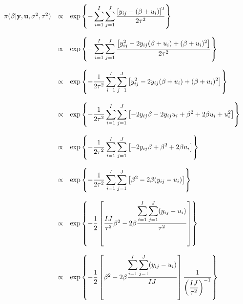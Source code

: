 \documentclass{article}
\begin{document}
\begin{equation*}
\begin{array}{lcl ll }
\pi(\beta|\textbf{y}, \textbf{u}, \sigma^2,\tau^2) & \propto &  \mbox{exp}\left\{ - \displaystyle\sum_{i=1}^{I}\sum_{j=1}^{J}\frac{\left[ y_{ij} - (\beta + u_i) \right]^2}{2\tau^2} \right\} \\\\

& \propto &  \mbox{exp}\left\{ - \displaystyle\sum_{i=1}^{I}\sum_{j=1}^{J}\frac{\left[ y_{ij}^2 - 2y_{ij}(\beta + u_i) + (\beta + u_i)^2 \right]}{2\tau^2} \right\} \\\\

& \propto &  \mbox{exp}\left\{ - \dfrac{1}{2\tau^2}\displaystyle\sum_{i=1}^{I}\sum_{j=1}^{J}\left[ y_{ij}^2 - 2y_{ij}(\beta + u_i) + (\beta + u_i)^2 \right] \right\} \\\\

& \propto &  \mbox{exp}\left\{ - \dfrac{1}{2\tau^2}\displaystyle\sum_{i=1}^{I}\sum_{j=1}^{J}\left[ - 2y_{ij}\beta -2y_{ij}u_i + \beta^2 + 2\beta u_i + u_i^2 \right] \right\} \\\\

& \propto &  \mbox{exp}\left\{ - \dfrac{1}{2\tau^2}\displaystyle\sum_{i=1}^{I}\sum_{j=1}^{J}\left[ - 2y_{ij}\beta + \beta^2 + 2\beta u_i \right] \right\} \\\\

& \propto &  \mbox{exp}\left\{ - \dfrac{1}{2\tau^2}\displaystyle\sum_{i=1}^{I}\sum_{j=1}^{J}\left[ \beta^2 - 2\beta (y_{ij} - u_i) \right] \right\} \\\\

& \propto &  \mbox{exp}\left\{ - \dfrac{1}{2}\left[ \dfrac{IJ}{\tau^2}\beta^2 - 2\beta \dfrac{\displaystyle\sum_{i=1}^{I}\sum_{j=1}^{J}(y_{ij} - u_i)}{\tau^2} \right] \right\} \\\\

& \propto &  \mbox{exp}\left\{ - \dfrac{1}{2}\left[\beta^2 - 2\beta \dfrac{\displaystyle\sum_{i=1}^{I}\sum_{j=1}^{J}(y_{ij} - u_i)}{IJ} \right]\dfrac{1}{\left(\dfrac{IJ}{\tau^2}\right)^{-1}} \right\} \\\\
 \end{array}
\end{equation*}
\end{document}
